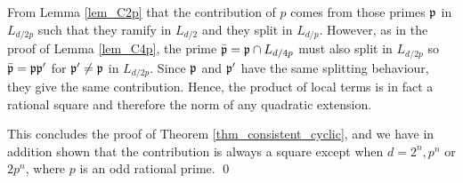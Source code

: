 From Lemma \ref*{lem_C2p} that the contribution of $p$ comes from those primes $\mathfrak{p}$ in $L_{d/2p}$ such that they ramify in $L_{d/2}$ and they split in $L_{d/p}$. However, as in the proof of Lemma \ref*{lem_C4p}, the prime $\bar{\mathfrak{p}}=\mathfrak{p}\cap L_{d/4p}$ must also split in $L_{d/2p}$ so $\bar{\mathfrak{p}}=\mathfrak{p}\mathfrak{p}'$ for $\mathfrak{p}'\neq\mathfrak{p}$ in $L_{d/2p}$. Since $\mathfrak{p}$ and $\mathfrak{p}'$ have the same splitting behaviour, they give the same contribution. Hence, the product of local terms is in fact a rational square and therefore the norm of any quadratic extension.

This concludes the proof of Theorem \ref*{thm_consistent_cyclic}, and we have in addition shown that the contribution is always a square except when $d=2^n,p^n$ or $2p^n$, where $p$ is an odd rational prime.
\qed

